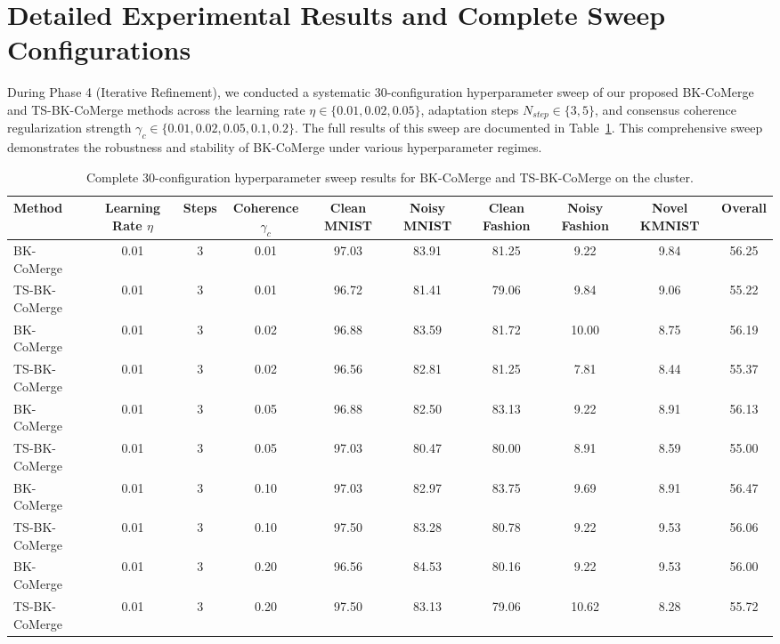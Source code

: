 \documentclass{article}
\theoremstyle{plain}
\theoremstyle{definition}
\theoremstyle{remark}
\begin{document}
\section{Detailed Experimental Results and Complete Sweep Configurations}
During Phase 4 (Iterative Refinement), we conducted a systematic 30-configuration hyperparameter sweep of our proposed BK-CoMerge and TS-BK-CoMerge methods across the learning rate $\eta \in \{0.01, 0.02, 0.05\}$, adaptation steps $N_{step} \in \{3, 5\}$, and consensus coherence regularization strength $\gamma_c \in \{0.01, 0.02, 0.05, 0.1, 0.2\}$. The full results of this sweep are documented in Table~\ref{tab:full_sweep}. This comprehensive sweep demonstrates the robustness and stability of BK-CoMerge under various hyperparameter regimes.

\begin{table}[h]
\caption{Complete 30-configuration hyperparameter sweep results for BK-CoMerge and TS-BK-CoMerge on the cluster.}
\label{tab:full_sweep}
\vskip 0.15in
\begin{center}
\begin{small}
\begin{tabular}{lccccccccc}
\toprule
Method & Learning Rate $\eta$ & Steps & Coherence $\gamma_c$ & Clean MNIST & Noisy MNIST & Clean Fashion & Noisy Fashion & Novel KMNIST & Overall \\
\midrule
BK-CoMerge & 0.01 & 3 & 0.01 & 97.03 & 83.91 & 81.25 & 9.22 & 9.84 & 56.25 \\
TS-BK-CoMerge & 0.01 & 3 & 0.01 & 96.72 & 81.41 & 79.06 & 9.84 & 9.06 & 55.22 \\
BK-CoMerge & 0.01 & 3 & 0.02 & 96.88 & 83.59 & 81.72 & 10.00 & 8.75 & 56.19 \\
TS-BK-CoMerge & 0.01 & 3 & 0.02 & 96.56 & 82.81 & 81.25 & 7.81 & 8.44 & 55.37 \\
BK-CoMerge & 0.01 & 3 & 0.05 & 96.88 & 82.50 & 83.13 & 9.22 & 8.91 & 56.13 \\
TS-BK-CoMerge & 0.01 & 3 & 0.05 & 97.03 & 80.47 & 80.00 & 8.91 & 8.59 & 55.00 \\
BK-CoMerge & 0.01 & 3 & 0.10 & 97.03 & 82.97 & 83.75 & 9.69 & 8.91 & 56.47 \\
TS-BK-CoMerge & 0.01 & 3 & 0.10 & 97.50 & 83.28 & 80.78 & 9.22 & 9.53 & 56.06 \\
BK-CoMerge & 0.01 & 3 & 0.20 & 96.56 & 84.53 & 80.16 & 9.22 & 9.53 & 56.00 \\
TS-BK-CoMerge & 0.01 & 3 & 0.20 & 97.50 & 83.13 & 79.06 & 10.62 & 8.28 & 55.72 \\

\end{tabular}
\end{small}
\end{center}
\end{table}
\end{document}

